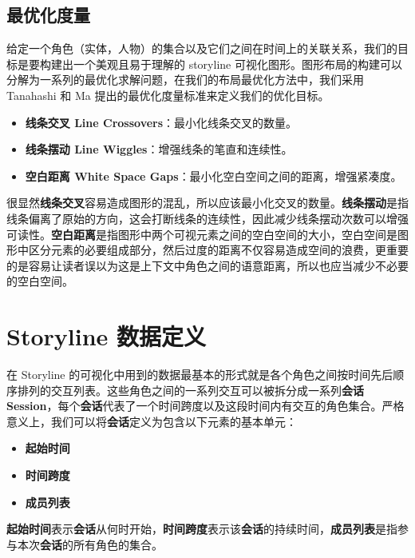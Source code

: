 \subsection{最优化度量}
\label{metrics}
给定一个角色（实体，人物）的集合以及它们之间在时间上的关联关系，我们的目标是要构建出一个美观且易于理解的 storyline 可视化图形。图形布局的构建可以分解为一系列的最优化求解问题，在我们的布局最优化方法中，我们采用 Tanahashi 和 Ma \cite{tanahashi2012design} 提出的最优化度量标准来定义我们的优化目标。
\begin{itemize}
\item \textbf{线条交叉 Line Crossovers}：最小化线条交叉的数量。
\item \textbf{线条摆动 Line Wiggles}：增强线条的笔直和连续性。
\item \textbf{空白距离 White Space Gaps}：最小化空白空间之间的距离，增强紧凑度。
\end{itemize}
很显然\textbf{线条交叉}容易造成图形的混乱，所以应该最小化交叉的数量。\textbf{线条摆动}是指线条偏离了原始的方向，这会打断线条的连续性，因此减少线条摆动次数可以增强可读性。\textbf{空白距离}是指图形中两个可视元素之间的空白空间的大小，空白空间是图形中区分元素的必要组成部分，然后过度的距离不仅容易造成空间的浪费，更重要的是容易让读者误以为这是上下文中角色之间的语意距离，所以也应当减少不必要的空白空间。

\section{Storyline 数据定义}
在 Storyline 的可视化中用到的数据最基本的形式就是各个角色之间按时间先后顺序排列的交互列表。这些角色之间的一系列交互可以被拆分成一系列\textbf{会话 Session}，每个\textbf{会话}代表了一个时间跨度以及这段时间内有交互的角色集合。严格意义上，我们可以将\textbf{会话}定义为包含以下元素的基本单元：
\begin{itemize}
\item \textbf{起始时间}
\item \textbf{时间跨度}
\item \textbf{成员列表}
\end{itemize}
\textbf{起始时间}表示\textbf{会话}从何时开始，\textbf{时间跨度}表示该\textbf{会话}的持续时间，\textbf{成员列表}是指参与本次\textbf{会话}的所有角色的集合。
